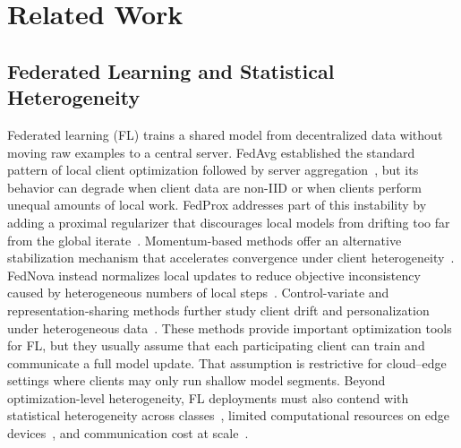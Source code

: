 \section{Related Work}
\label{sec:related}

\subsection{Federated Learning and Statistical Heterogeneity}
Federated learning (FL) trains a shared model from decentralized data without moving raw examples to a central server. FedAvg established the standard pattern of local client optimization followed by server aggregation~\cite{mcmahan2017communication}, but its behavior can degrade when client data are non-IID or when clients perform unequal amounts of local work. FedProx addresses part of this instability by adding a proximal regularizer that discourages local models from drifting too far from the global iterate~\cite{li2020federated}. Momentum-based methods offer an alternative stabilization mechanism that accelerates convergence under client heterogeneity~\cite{cheng2024momentumbenefits,zaccone2025communication}. FedNova instead normalizes local updates to reduce objective inconsistency caused by heterogeneous numbers of local steps~\cite{10.5555/3495724.3496362}. Control-variate and representation-sharing methods further study client drift and personalization under heterogeneous data~\cite{pmlr-v119-karimireddy20a,collins2021exploiting}. These methods provide important optimization tools for FL, but they usually assume that each participating client can train and communicate a full model update. That assumption is restrictive for cloud--edge settings where clients may only run shallow model segments. Beyond optimization-level heterogeneity, FL deployments must also contend with statistical heterogeneity across classes~\cite{10660707,nguyen2026towards}, limited computational resources on edge devices~\cite{MAL-083,11180918}, and communication cost at scale~\cite{9084352,9760729,nguyen2022hcfl,nguyen2025federated}.

